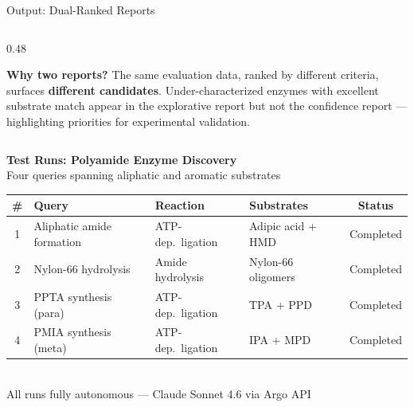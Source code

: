 \documentclass[aspectratio=169, 11pt]{beamer}
\begin{document}
\begin{frame}{Output: Dual-Ranked Reports}
\begin{columns}[T]
\begin{column}{0.48\textwidth}
\vspace{2pt}
\begin{center}
\colorbox{lightblue!50}{\parbox{0.92\textwidth}{\centering
\scriptsize\textbf{Why two reports?} The same evaluation data, ranked by different criteria, surfaces \textbf{different candidates}. Under-characterized enzymes with excellent substrate match appear in the explorative report but not the confidence report --- highlighting priorities for experimental validation.
}}
\end{center}

\end{column}
\end{columns}
\end{frame}

{
\begin{frame}[plain]
\vfill
\begin{center}
{\Large\bfseries\color{white} Test Runs: Polyamide Enzyme Discovery}\\[10pt]
{\large\color{lightblue!80} Four queries spanning aliphatic and aromatic substrates}\\[16pt]
\colorbox{white!95}{\begin{minipage}{0.92\textwidth}
\centering\small
\begin{tabular}{@{}c p{5.5cm} l l c@{}}
\toprule
\textbf{\#} & \textbf{Query} & \textbf{Reaction} & \textbf{Substrates} & \textbf{Status}\\
\midrule
1 & Aliphatic amide formation & ATP-dep.\ ligation & Adipic acid + HMD & Completed\\
2 & Nylon-66 hydrolysis & Amide hydrolysis & Nylon-66 oligomers & Completed\\
3 & PPTA synthesis (para) & ATP-dep.\ ligation & TPA + PPD & Completed\\
4 & PMIA synthesis (meta) & ATP-dep.\ ligation & IPA + MPD & Completed\\
\bottomrule
\end{tabular}
\end{minipage}}
\\[12pt]
{\small\color{white!80} All runs fully autonomous --- Claude Sonnet 4.6 via Argo API}
\end{center}
\vfill
\end{frame}
}
\end{document}
